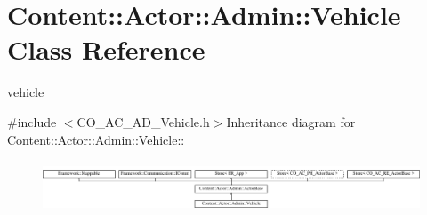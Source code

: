 \hypertarget{classContent_1_1Actor_1_1Admin_1_1Vehicle}{
\section{Content::Actor::Admin::Vehicle Class Reference}
\label{classContent_1_1Actor_1_1Admin_1_1Vehicle}
}


vehicle  


{\ttfamily \#include $<$CO\_\-AC\_\-AD\_\-Vehicle.h$>$}Inheritance diagram for Content::Actor::Admin::Vehicle::\begin{figure}[H]
\begin{center}
\leavevmode
\includegraphics[height=1.54839cm]{classContent_1_1Actor_1_1Admin_1_1Vehicle}
\end{center}
\end{figure}
